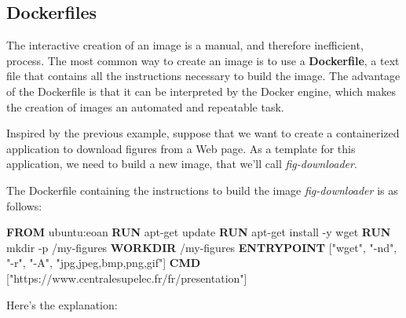 \documentclass[
]{article}
\newenvironment{Shaded}{\begin{snugshade}}{\end{snugshade}}
\newcommand{\KeywordTok}[1]{\textcolor[rgb]{0.13,0.29,0.53}{\textbf{#1}}}
\newcommand{\NormalTok}[1]{#1}
\newcommand{\StringTok}[1]{\textcolor[rgb]{0.31,0.60,0.02}{#1}}
\theoremstyle{definition}
\theoremstyle{definition}
\theoremstyle{definition}
\theoremstyle{remark}
\begin{document}
\hypertarget{dockerfiles}{%
\subsection{Dockerfiles}\label{dockerfiles}}

The interactive creation of an image is a manual, and therefore inefficient, process.
The most common way to create an image is to use a \textbf{Dockerfile}, a
text file that contains all the instructions necessary to
build the image.
The advantage of the Dockerfile is that it can be interpreted
by the Docker engine, which makes the creation of images an automated
and repeatable task.

Inspired by the previous example, suppose that we want to create a containerized
application to download figures from a Web page.
As a template for this application, we need to build a new
image, that we'll call \emph{fig-downloader}.

The Dockerfile containing the instructions to build the image
\emph{fig-downloader} is as follows:

\begin{Shaded}
\begin{Highlighting}[]
\KeywordTok{FROM}\NormalTok{ ubuntu:eoan}
\KeywordTok{RUN}\NormalTok{ apt{-}get update}
\KeywordTok{RUN}\NormalTok{ apt{-}get install {-}y wget}
\KeywordTok{RUN}\NormalTok{ mkdir {-}p /my{-}figures}
\KeywordTok{WORKDIR}\NormalTok{ /my{-}figures}
\KeywordTok{ENTRYPOINT}\NormalTok{ [}\StringTok{"wget"}\NormalTok{, }\StringTok{"{-}nd"}\NormalTok{, }\StringTok{"{-}r"}\NormalTok{, }\StringTok{"{-}A"}\NormalTok{, }\StringTok{"jpg,jpeg,bmp,png,gif"}\NormalTok{]}
\KeywordTok{CMD}\NormalTok{ [}\StringTok{"https://www.centralesupelec.fr/fr/presentation"}\NormalTok{]}
\end{Highlighting}
\end{Shaded}

Here's the explanation:
\end{document}
